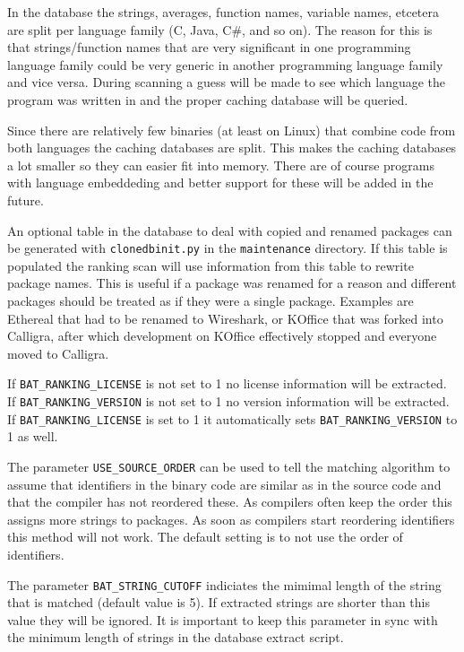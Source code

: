 \documentclass[10pt,a4paper]{article}
\begin{document}
In the database the strings, averages, function names, variable names, etcetera
are split per language family (C, Java, C\#, and so on). The reason for this is
that strings/function names that are very significant in one programming
language family could be very generic in another programming language family
and vice versa. During scanning a guess will be made to see which language the
program was written in and the proper caching database will be queried.

Since there are relatively few binaries (at least on Linux) that combine
code from both languages the caching databases are split. This makes the
caching databases a lot smaller so they can easier fit into memory. There are
of course programs with language embeddeding and better support for these will
be added in the future.

An optional table in the database to deal with copied and renamed packages can
be generated with  \texttt{clonedbinit.py} in the \texttt{maintenance}
directory. If this table is populated the ranking scan will use information
from this table to rewrite package names. This is useful if a package was
renamed for a reason and different packages should be treated as if they were
a single package. Examples are Ethereal that had to be renamed to Wireshark,
or KOffice that was forked into Calligra, after which development on KOffice
effectively stopped and everyone moved to Calligra.

If \texttt{BAT\_RANKING\_LICENSE} is not set to 1 no license information will
be extracted. If \texttt{BAT\_RANKING\_VERSION} is not set to 1 no version
information will be extracted. If \texttt{BAT\_RANKING\_LICENSE} is set to 1 it
automatically sets \texttt{BAT\_RANKING\_VERSION} to 1 as well.

The parameter \texttt{USE\_SOURCE\_ORDER} can be used to tell the matching
algorithm to assume that identifiers in the binary code are similar as in the
source code and that the compiler has not reordered these. As compilers often
keep the order this assigns more strings to packages. As soon as compilers
start reordering identifiers this method will not work. The default setting
is to not use the order of identifiers.

The parameter \texttt{BAT\_STRING\_CUTOFF} indiciates the mimimal length of the
string that is matched (default value is 5). If extracted strings are shorter
than this value they will be ignored. It is important to keep this parameter in
sync with the minimum length of strings in the database extract script.
\end{document}
